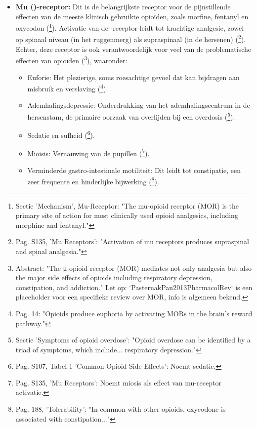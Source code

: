 \documentclass[11pt, a4paper]{report} %
\begin{document}
\begin{itemize}
    \item \textbf{Mu (\textmu)-receptor:} Dit is de belangrijkste receptor voor de pijnstillende effecten van de meeste klinisch gebruikte opioïden, zoals morfine, fentanyl en oxycodon (\cite{StatPearlsOpioidReceptor}\footnote{Sectie 'Mechanism', Mu-Receptor: "The mu-opioid receptor (MOR) is the primary site of action for most clinically used opioid analgesics, including morphine and fentanyl."}). Activatie van de \textmu-receptor leidt tot krachtige analgesie, zowel op spinaal niveau (in het ruggenmerg) als supraspinaal (in de hersenen) (\cite{Trescot2008OpioidPharm}\footnote{Pag. S135, 'Mu Receptors': "Activation of mu receptors produces supraspinal and spinal analgesia."}). Echter, deze receptor is ook verantwoordelijk voor veel van de problematische effecten van opioïden (\cite{PasternakPan2013PharmacolRev}\footnote{Abstract: "The μ opioid receptor (MOR) mediates not only analgesia but also the major side effects of opioids including respiratory depression, constipation, and addiction." Let op: `PasternakPan2013PharmacolRev` is een placeholder voor een specifieke review over MOR, info is algemeen bekend.}), waaronder:
        \begin{itemize}
            \item Euforie: Het plezierige, soms roesachtige gevoel dat kan bijdragen aan misbruik en verslaving (\cite{Kosten2002NeurobiologyDependence}\footnote{Pag. 14: "Opioids produce euphoria by activating MORs in the brain’s reward pathway."}).
            \item Ademhalingsdepressie: Onderdrukking van het ademhalingscentrum in de hersenstam, de primaire oorzaak van overlijden bij een overdosis (\cite{WHO2023Opioid}\footnote{Sectie 'Symptoms of opioid overdose': "Opioid overdose can be identified by a triad of symptoms, which include... respiratory depression."}).
            \item Sedatie en sufheid (\cite{Benyamin2008OpioidComplications}\footnote{Pag. S107, Tabel 1 'Common Opioid Side Effects': Noemt sedatie.}).
            \item Mioisis: Vernauwing van de pupillen (\cite{Trescot2008OpioidPharm}\footnote{Pag. S135, 'Mu Receptors': Noemt miosis als effect van mu-receptor activatie.}).
            \item Verminderde gastro-intestinale motiliteit: Dit leidt tot constipatie, een zeer frequente en hinderlijke bijwerking (\cite{Riley2008OxycodoneReview}\footnote{Pag. 188, 'Tolerability': "In common with other opioids, oxycodone is associated with constipation..."}).

\end{itemize}
\end{itemize}
\end{document}
